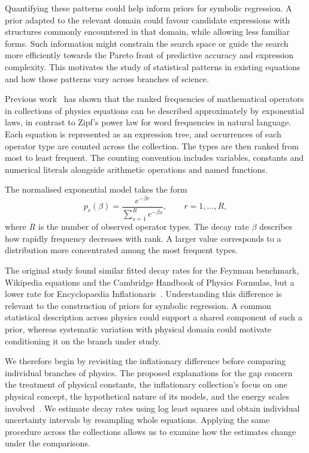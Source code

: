 \documentclass[10pt]{article}
\begin{document}
Quantifying these patterns could help inform priors for symbolic regression. A prior adapted to the relevant domain could favour candidate expressions with structures commonly encountered in that domain, while allowing less familiar forms. Such information might constrain the search space or guide the search more efficiently towards the Pareto front of predictive accuracy and expression complexity. This motivates the study of statistical patterns in existing equations and how those patterns vary across branches of science.

Previous work~\citep{constantin2024} has shown that the ranked frequencies of mathematical operators in collections of physics equations can be described approximately by exponential laws, in contrast to Zipf's power law for word frequencies in natural language. Each equation is represented as an expression tree, and occurrences of each operator type are counted across the collection. The types are then ranked from most to least frequent. The counting convention includes variables, constants and numerical literals alongside arithmetic operations and named functions.

The normalised exponential model takes the form
\begin{equation}
p_r(\beta)=\frac{e^{-\beta r}}{\sum_{s=1}^{R}e^{-\beta s}},
\qquad r=1,\ldots,R,
\label{eq:law}
\end{equation}
where $R$ is the number of observed operator types. The decay rate $\beta$ describes how rapidly frequency decreases with rank. A larger value corresponds to a distribution more concentrated among the most frequent types.

The original study found similar fitted decay rates for the Feynman benchmark, Wikipedia equations and the Cambridge Handbook of Physics Formulas, but a lower rate for Encyclopaedia Inflationaris~\citep{constantin2024}. Understanding this difference is relevant to the construction of priors for symbolic regression. A common statistical description across physics could support a shared component of such a prior, whereas systematic variation with physical domain could motivate conditioning it on the branch under study.

We therefore begin by revisiting the inflationary difference before comparing individual branches of physics. The proposed explanations for the gap concern the treatment of physical constants, the inflationary collection's focus on one physical concept, the hypothetical nature of its models, and the energy scales involved~\citep{constantin2024}. We estimate decay rates using log least squares and obtain individual uncertainty intervals by resampling whole equations. Applying the same procedure across the collections allows us to examine how the estimates change under the comparisons.
\end{document}
